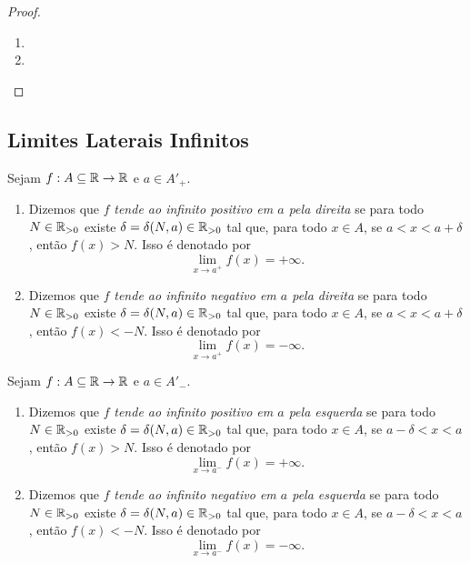\begin{proof}
    \leavevmode
        \begin{enumerate}[leftmargin=*, align=left, label=\textbf{(\alph*)}]
            \item \blackproof
            \item \blackproof
        \end{enumerate}
\end{proof}

\subsection{Limites Laterais Infinitos}

\begin{definition}
    Sejam $f : A \subseteq \mathbb{R} \to \mathbb{R}$ e $a \in A'_+$.
        \begin{enumerate}[leftmargin=*, align=left, label=\textbf{(\alph*)}]
            \item Dizemos que $f$ \emph{tende ao infinito positivo em $a$ pela direita} se para todo $N \in \mathbb{R}_{>0}$ existe $\delta = \delta(N,a) \in \mathbb{R}_{>0}$ tal que, para todo $x \in A$, se $a < x < a + \delta$, então $f(x) > N$. Isso é denotado por
                \[
                    \lim_{x \to a^+} f(x) = +\infty.
                \]
            \item Dizemos que $f$ \emph{tende ao infinito negativo em $a$ pela direita} se para todo $N \in \mathbb{R}_{>0}$ existe $\delta = \delta(N,a) \in \mathbb{R}_{>0}$ tal que, para todo $x \in A$, se $a < x < a + \delta$, então $f(x) < -N$. Isso é denotado por
                \[
                    \lim_{x \to a^+} f(x) = -\infty.
                \]
        \end{enumerate}
\end{definition}

\begin{definition}
    Sejam $f : A \subseteq \mathbb{R} \to \mathbb{R}$ e $a \in A'_-$.
        \begin{enumerate}[leftmargin=*, align=left, label=\textbf{(\alph*)}]
            \item Dizemos que $f$ \emph{tende ao infinito positivo em $a$ pela esquerda} se para todo $N \in \mathbb{R}_{>0}$ existe $\delta = \delta(N,a) \in \mathbb{R}_{>0}$ tal que, para todo $x \in A$, se $a-\delta<x<a$, então $f(x) > N$. Isso é denotado por
                \[
                    \lim_{x \to a^-} f(x) = +\infty.
                \]
            \item Dizemos que $f$ \emph{tende ao infinito negativo em $a$ pela esquerda} se para todo $N \in \mathbb{R}_{>0}$ existe $\delta = \delta(N,a) \in \mathbb{R}_{>0}$ tal que, para todo $x \in A$, se $a-\delta<x<a$, então $f(x) < -N$. Isso é denotado por
                \[
                    \lim_{x \to a^-} f(x) = -\infty.
                \]
        \end{enumerate}
\end{definition}

